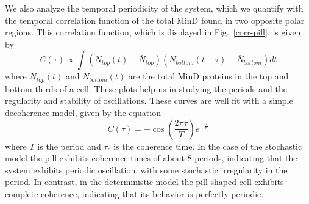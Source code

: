 \documentclass[10pt,letterpaper]{article}
\begin{document}
We also analyze the temporal periodicity of the system, which we
quantify with the temporal correlation function of the total MinD
found in two opposite polar regions.  This correlation function, which
is displayed in Fig.~\ref{corr-pill}, is given by
\begin{equation}
  C(\tau) \propto \int
  (N_{\textit{top}}(t) - \bar N_{\textit{top}})
  (N_{\textit{bottom}}(t+\tau) - \bar N_{\textit{bottom}})dt
\end{equation}
where $N_{\textit{top}}(t)$ and $N_{\textit{bottom}}(t)$ are the total
MinD proteins in the top and bottom thirds of a cell.  These plots
help us in studying the periods and the regularity and stability of
oscillations.  These curves are well fit with a simple decoherence
model, given by the equation
\begin{equation}
  C(\tau) = -\cos\left(\frac{2\pi\tau}{T}\right) e^{-\frac{\tau}{\tau_c}}
\end{equation}
where $T$ is the period and $\tau_c$ is the coherence time.  In the
case of the stochastic model the pill exhibits coherence times of
about 8 periods, indicating that the system exhibits periodic
oscillation, with some stochastic irregularity in the period.
%
In contrast, in the deterministic model the pill-shaped cell exhibits
complete coherence, indicating that its behavior is perfectly
periodic.
\end{document}
